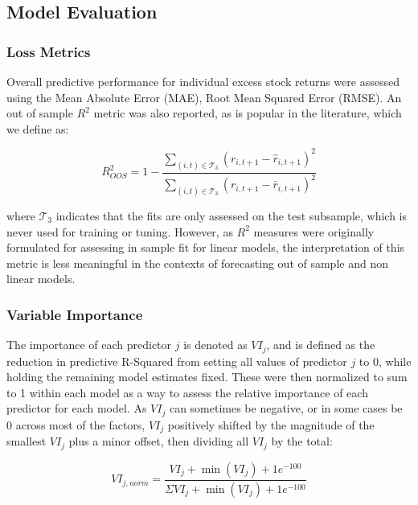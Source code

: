 \documentclass[a4paper, table]{article}
\begin{document}
\subsection{Model Evaluation}
\label{model_evaluation}

\subsubsection{Loss Metrics}

Overall predictive performance for individual excess stock returns were assessed using the Mean Absolute Error (MAE), Root Mean Squared Error (RMSE). An out of sample $R^2$ metric was also reported, as is popular in the literature, which we define as:

\begin{equation}
R^2_{OOS} = 1 - \frac{\sum_{(i, t)\in\mathcal{T}_3}(r_{i, t+1} - \widehat{r}_{i, t+1})^2}
{\sum_{(i, t)\in\mathcal{T}_3} \left( r_{i, t+1} - \bar{r}_{i, t+1} \right) ^2}
\end{equation}

where $\mathcal{T}_3$ indicates that the fits are only assessed on the test subsample, which is never used for training or tuning. However, as $R^2$ measures were originally formulated for assessing in sample fit for linear models, the interpretation of this metric is less meaningful in the contexts of forecasting out of sample and non linear models.

\subsubsection{Variable Importance}

The importance of each predictor $j$ is denoted as $VI_j$, and is defined as the reduction in predictive R-Squared from setting all values of predictor $j$ to 0, while holding the remaining model estimates fixed. These were then normalized to sum to 1 within each model as a way to assess the relative importance of each predictor for each model. As $VI_j$ can sometimes be negative, or in some cases be 0 across most of the factors, $VI_j$ positively shifted by the magnitude of the smallest $VI_j$ plus a minor offset, then dividing all $VI_j$ by the total:

\begin{equation}
VI_{j, norm} = \frac{VI_j + \operatorname{min}(VI_j) + 1e^{-100}}
{\Sigma VI_j + \operatorname{min}(VI_j) + 1e^{-100}}
\end{equation}
\end{document}
